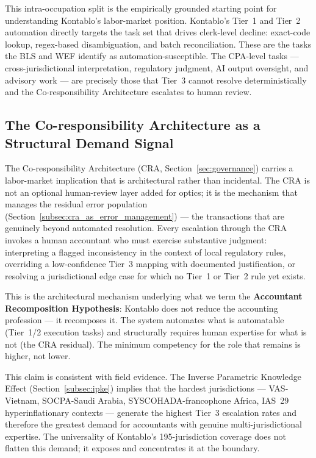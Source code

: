 This intra-occupation split is the empirically grounded starting point for
understanding Kontablo's labor-market position. Kontablo's Tier~1 and
Tier~2 automation directly targets the task set that drives clerk-level
decline: exact-code lookup, regex-based disambiguation, and batch
reconciliation. These are the tasks the BLS and WEF identify as
automation-susceptible. The CPA-level tasks --- cross-jurisdictional interpretation,
regulatory judgment, AI output oversight, and advisory work --- are
precisely those that Tier~3 cannot resolve deterministically and the
Co-responsibility Architecture escalates to human review.

\subsection{The Co-responsibility Architecture as a Structural Demand Signal}
\label{subsec:cra_demand}

The Co-responsibility Architecture (CRA, Section~\ref{sec:governance}) carries a labor-market
implication that is architectural rather than incidental. The CRA is not an
optional human-review layer added for optics; it is the mechanism that
manages the residual error population (Section~\ref{subsec:cra_as_error_management})
--- the transactions that are genuinely beyond automated resolution. Every
escalation through the CRA invokes a human accountant who must exercise
substantive judgment: interpreting a flagged inconsistency in the context
of local regulatory rules, overriding a low-confidence Tier~3 mapping with
documented justification, or resolving a jurisdictional edge case for which
no Tier~1 or Tier~2 rule yet exists.

This is the architectural mechanism underlying what we term the
\textbf{Accountant Recomposition Hypothesis}: Kontablo does not reduce the
accounting profession --- it recomposes it. The system automates what is
automatable (Tier~1/2 execution tasks) and structurally requires human
expertise for what is not (the CRA residual). The minimum competency for
the role that remains is higher, not lower.

This claim is consistent with field evidence. The Inverse Parametric
Knowledge Effect (Section~\ref{subsec:ipke}) implies that the hardest
jurisdictions --- VAS-Vietnam, SOCPA-Saudi Arabia, SYSCOHADA-francophone
Africa, IAS~29 hyperinflationary contexts --- generate the highest Tier~3
escalation rates and therefore the greatest demand for accountants with
genuine multi-jurisdictional expertise. The universality of Kontablo's
195-jurisdiction coverage does not flatten this demand; it exposes and
concentrates it at the boundary.

